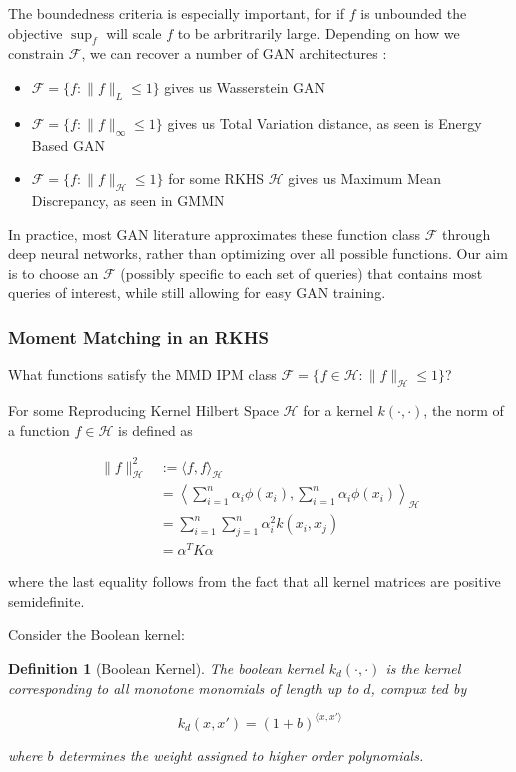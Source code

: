 \documentclass[]{article}
\newcommand{\F}{\mathcal{F}}
\newtheorem{definition}{Definition}[section]
\theoremstyle{definition}
\begin{document}
The boundedness criteria is especially important, for if $f$ is unbounded the objective $\sup_f$ will scale $f$ to be arbritrarily large. Depending on how we constrain $\mathcal{F}$, we can recover a number of GAN architectures \cite{zotero-1283}: 

\begin{itemize}
    \item $\F = \{f: \|f\|_L \leq 1\}$ gives us Wasserstein GAN \cite{ACB17}
    \item $\F = \{f: \|f\|_\infty \leq 1 \}$ gives us Total Variation distance, as seen is Energy Based GAN \cite{ZML17}
    \item $\F = \{f: \|f\|_\mathcal{H} \leq 1 \}$ for some RKHS $\mathcal{H}$  gives us Maximum Mean Discrepancy, as seen in GMMN \cite{LSZ15a}
\end{itemize}

In practice, most GAN literature approximates these function class $\mathcal{F}$ through deep neural networks, rather than optimizing over all possible functions. Our aim is to choose an $\F$ (possibly specific to each set of queries) that contains most queries of interest, while still allowing for easy GAN training. 

\subsubsection{Moment Matching in an RKHS}

What functions satisfy the MMD IPM class  $\F = \{f \in \mathcal{H}: \|f\|_\mathcal{H} \leq 1 \}$? 

For some Reproducing Kernel Hilbert Space $\mathcal{H}$ for a kernel $k(\cdot,\cdot)$, the norm of a function $f \in \mathcal{H}$ is defined as 

\begin{align*}
    \| f \|^2_\mathcal{H} &:= \langle f, f \rangle _\mathcal{H}  \\
    &= \left \langle \sum_{i=1}^n \alpha_i \phi(x_i) , \sum_{i=1}^n \alpha_i \phi(x_i)   \right\rangle  _\mathcal{H} \\
    &= \sum_{i=1}^n \sum_{j=1}^n \alpha_i^2 k(x_i, x_j) \\
    &= \alpha^TK\alpha
\end{align*}

where the last equality follows from the fact that all kernel matrices are positive semidefinite.

Consider the Boolean kernel:

\begin{definition}[Boolean Kernel]
    The boolean kernel $k_d(\cdot, \cdot)$ is the kernel corresponding to all monotone monomials of length 
    up to $d$, compux   ted by
    
    \begin{equation}
        k_d(x, x') = (1+b)^{\langle x, x' \rangle}
    \end{equation}

    where $b$ determines the weight assigned to higher order polynomials. 
\end{definition}
\end{document}
